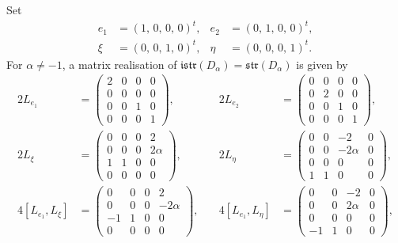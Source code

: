 \documentclass{amsart}
\numberwithin{theorem}{section}
\theoremstyle{definition}
\theoremstyle{remark}
\begin{document}
Set \begin{align*}
e_1 &=\left(1,\,0,\,0,\,0\right)^t,& e_2 &=\left(0,\,1,\,0,\,0\right)^t,\\
\xi & = \left(0,\,0,\,1,\,0\right)^t,& \eta &= \left(0,\,0,\,0,\,1\right)^t. \end{align*}
For $\alpha\neq -1$, a matrix realisation of $\mathfrak{istr}(D_\alpha)=\mathfrak{str}(D_\alpha)$ is given by 
\begin{align*}
2L_{e_1} &=\left(\begin{array}{cc|cc}
2 & 0 & 0 & 0 \\
0 & 0 & 0 & 0 \\ \hline
0 & 0 & 1 & 0 \\
0 & 0 & 0 & 1
\end{array}\right), &\quad 
2L_{e_2}&= \left(\begin{array}{cc|cc}
0 & 0 & 0 & 0 \\
0 & 2 & 0 & 0 \\ \hline
0 & 0 & 1 & 0 \\
0 & 0 & 0 & 1
\end{array}\right)
, \\
%
2L_{\xi} &=\left(\begin{array}{cc|cc}
0 & 0 & 0 & 2 \\
0 & 0 & 0 & 2\alpha \\ \hline
1 & 1 & 0 & 0 \\
0 & 0 & 0 & 0
\end{array}\right), &\quad 
2L_{\eta}&= \left(\begin{array}{cc|cc}
0 & 0 & -2 & 0 \\
0 & 0 & -2\alpha & 0 \\ \hline
0 & 0 & 0 & 0 \\
1 & 1 & 0 & 0
\end{array}\right)
, \\
%
 4[L_{e_1},L_{\xi}]&=\left(\begin{array}{cc|cc}
0 & 0 & 0 & 2 \\
0 & 0 & 0 & -2\alpha \\ \hline
-1 & 1 & 0 & 0 \\
0 & 0 & 0 & 0
\end{array}\right), &\quad
4[L_{e_1},L_{\eta}]&= \left(\begin{array}{cc|cc}
0 & 0 & -2 & 0 \\
0 & 0 & 2\alpha & 0 \\ \hline
0 & 0 & 0 & 0 \\
-1 & 1 & 0 & 0
\end{array}\right), 

\end{align*}
\end{document}
